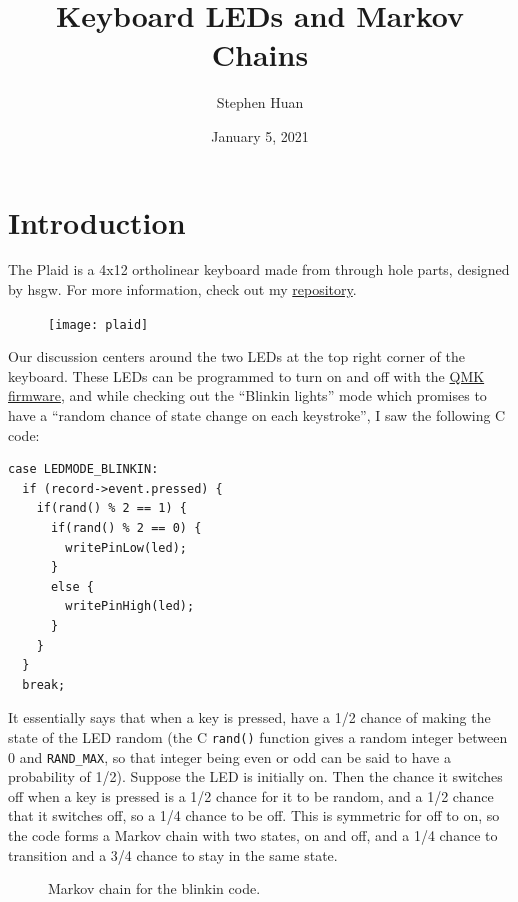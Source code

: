 \documentclass[11pt, oneside]{article}
\title{Keyboard LEDs and Markov Chains}
\author{Stephen Huan}
\date{January 5, 2021}
\begin{document}
\maketitle
\section{Introduction}

The Plaid is a 4x12 ortholinear keyboard made from through
hole parts, designed by hsgw. For more information, check out
my \href{https://github.com/stephen-huan/plaid}{repository}.

\begin{figure}[h!]
  \centering
  \texttt{[image: plaid]}
\end{figure}

Our discussion centers around the two LEDs at the top right corner of the keyboard.
These LEDs can be programmed to turn on and off with the 
\href{https://github.com/qmk/qmk_firmware/blob/master/keyboards/dm9records/plaid/keymaps/default/keymap.c}{QMK firmware},
and while checking out the \enquote{Blinkin lights} mode
which promises to have a \enquote{random chance of state
change on each keystroke}, I saw the following C code:
\begin{verbatim}
case LEDMODE_BLINKIN:
  if (record->event.pressed) {
    if(rand() % 2 == 1) {
      if(rand() % 2 == 0) {
        writePinLow(led);
      }
      else {
        writePinHigh(led);
      }
    }
  }
  break;
\end{verbatim}

It essentially says that when a key is pressed, have a 1/2 chance of making the
state of the LED random (the C \texttt{rand()} function gives a random integer
between 0 and \texttt{RAND\_MAX}, so that integer being even or odd can be said
to have a probability of 1/2). Suppose the LED is initially on. Then the chance
it switches off when a key is pressed is a 1/2 chance for it to be random, and
a 1/2 chance that it switches off, so a 1/4 chance to be off. This is symmetric
for off to on, so the code forms a Markov chain with two states, on and off,
and a 1/4 chance to transition and a 3/4 chance to stay in the same state.

\begin{figure}[h!]
  \centering
  \caption{Markov chain for the blinkin code.}
\end{figure}
\end{document}
